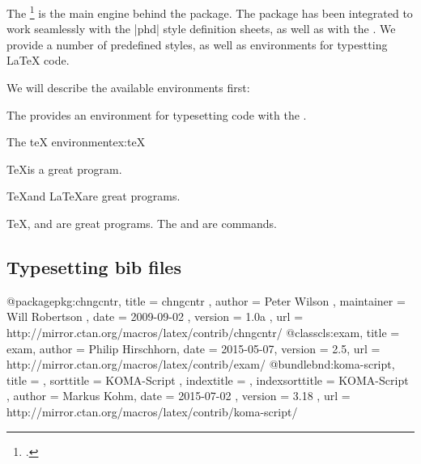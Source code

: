 The \footcite{listings} is the main engine behind the  package. The package
has been integrated to work seamlessly with the |phd| style definition sheets, as well as with the . We provide a number of predefined styles, as well as environments for typestting LaTeX code.

We will describe the available environments first:

The  provides an environment for typesetting code with the .

\begin{texexample}{The teX environment}{ex:teX}
\begin{teX}
\TeX is a great program.
\end{teX}
\end{texexample}


\begin{teXX}
\TeX and \LaTeX are great programs.
\end{teXX}

\begin{teXXX}
\TeX,  \latexe and  are great programs. The \IfNoValueF and \IfNoValueTF are 
commands.
\end{teXXX}

\subsection{Typesetting bib files}
\begin{teXXX}
 @package{pkg:chngcntr,
    title      = {chngcntr} ,
    author     = {Peter Wilson} ,
    maintainer = {Will Robertson} ,
    date       = {2009-09-02} ,
    version    = {1.0a} ,
    url        = {http://mirror.ctan.org/macros/latex/contrib/chngcntr/}
  }
  @class{cls:exam,
    title      = {exam},
    author     = {Philip Hirschhorn},
    date       = {2015-05-07},
    version    = {2.5},
    url        = {http://mirror.ctan.org/macros/latex/contrib/exam/}
  }
  @bundle{bnd:koma-script,
    title          = {\KOMAScript} ,
    sorttitle      = {KOMA-Script} ,
    indextitle     = {\KOMAScript} ,
    indexsorttitle = {KOMA-Script} ,
    author         = {Markus Kohm},
    date           = {2015-07-02} ,
    version        = {3.18} ,
    url            = {http://mirror.ctan.org/macros/latex/contrib/koma-script/}
  }
\end{teXXX}
















